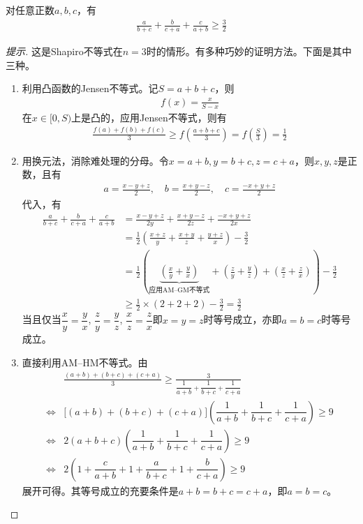 \begin{example}[Nesbitt不等式]
  对任意正数$a,b,c$，有
  \begin{align*}
    \frac{a}{b+c}+\frac{b}{c+a}+\frac{c}{a+b}\ge\frac32
  \end{align*}
\end{example}
\begin{proof}[提示]
  这是Shapiro不等式在$n=3$时的情形。有多种巧妙的证明方法。下面是其中三种。
  \begin{enumerate}
  \item 利用凸函数的Jensen不等式。记$S=a+b+c$，则
    \begin{align*}
      f(x)=\frac{x}{S-x}
    \end{align*}
    在$x\in[0,S)$上是凸的，应用Jensen不等式，则有
    \begin{align*}
      \frac{f(a) + f(b) + f(c)}{3}\ge f\left(\frac{a+b+c}{3}\right)=f\left(\frac{S}{3}\right)=\frac12
    \end{align*}
  \item 用换元法，消除难处理的分母。令$x=a+b,y=b+c,z=c+a$，则$x,y,z$是正数，且有
    \begin{align*}
      a=\frac{x-y+z}2,\quad b=\frac{x+y-z}2,\quad c=\frac{-x+y+z}2
    \end{align*}
    代入，有
    \begin{align*}
      \frac{a}{b+c}+\frac{b}{c+a}+\frac{c}{a+b}
      &= \frac{x-y+z}{2y} + \frac{x+y-z}{2z} + \frac{-x+y+z}{2x}\\
      &= \frac12\left(\frac{x+z}{y} + \frac{x+y}{z} + \frac{y+z}{x}\right)-\frac32\\
      &= \frac12\left( \underbrace{\left(\frac xy + \frac yx\right)}_{\text{应用AM--GM不等式}}
        +\left(\frac zy + \frac yz\right)
        +\left(\frac xz + \frac zx\right)
        \right)-\frac32\\
      &\ge \frac12\times ( 2 + 2 + 2) - \frac32=\frac32
    \end{align*}
    当且仅当$\dfrac xy=\dfrac yx$, $\dfrac zy=\dfrac yz$, $\dfrac xz=\dfrac zx$即$x=y=z$时等号成立，亦即$a=b=c$时等号成立。

  \item 直接利用AM--HM不等式。由
    \begin{align*}
      & \frac{(a+b)+(b+c)+(c+a)}{3}\ge \frac{3}{\dfrac1{a+b}+\dfrac1{b+c}+\dfrac1{c+a}}\\
      \iff & \big[(a+b)+(b+c)+(c+a)\big]\left(\dfrac1{a+b}+\dfrac1{b+c}+\dfrac1{c+a}\right)\ge 9\\
      \iff & 2(a+b+c)\left(\dfrac1{a+b}+\dfrac1{b+c}+\dfrac1{c+a}\right)\ge 9\\
      \iff & 2\left(1+\dfrac{c}{a+b}+1+\dfrac{a}{b+c}+1+\dfrac{b}{c+a}\right)\ge 9
    \end{align*}
    展开可得。其等号成立的充要条件是$a+b=b+c=c+a$，即$a=b=c$。$\qedhere$
  \end{enumerate}
\end{proof}

